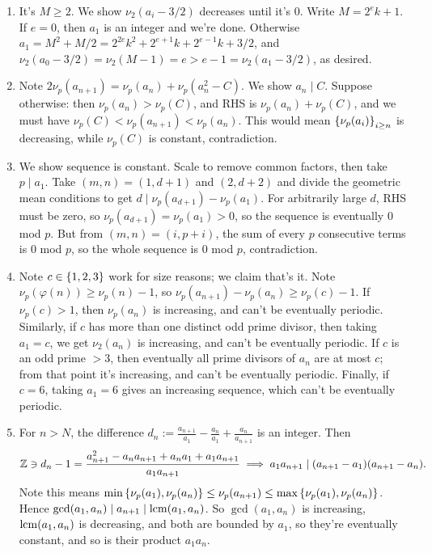 \documentclass[11pt,paper=letter]{scrartcl}
\begin{document}
\begin{enumerate}
\item It's $M \ge 2$. We show $\nu_2(a_i - 3/2)$ decreases until it's $0$. Write $M = 2^ek + 1$. If $e = 0$, then $a_1$ is an integer and we're done. Otherwise $a_1 = M^2 + M/2 = 2^{2e}k^2 + 2^{e + 1}k + 2^{e - 1}k + 3/2$, and $\nu_2(a_0 - 3/2) = \nu_2(M - 1) = e > e-1 = \nu_2(a_1 - 3/2)$, as desired.

\item Note $2\nu_p(a_{n+1}) = \nu_p(a_n) + \nu_p(a_n^2 - C)$. We show $a_n \mid C$. Suppose otherwise: then $\nu_p(a_n) > \nu_p(C)$, and RHS is $\nu_p(a_n) + \nu_p(C)$, and we must have $\nu_p(C) < \nu_p(a_{n+1}) < \nu_p(a_n)$. This would mean $\left\{ \nu_p(a_i) \right\}_{i \ge n}$ is decreasing, while $\nu_p(C)$ is constant, contradiction.

\item We show sequence is constant. Scale to remove common factors, then take $p \mid a_1$. Take $(m, n) = (1, d + 1)$ and $(2, d + 2)$ and divide the geometric mean conditions to get $ d \mid \nu_p( a_{d + 1} ) - \nu_p( a_1 ) $. For arbitrarily large $d$, RHS must be zero, so $\nu_p(a_{d+1}) = \nu_p(a_1) > 0$, so the sequence is eventually $0$ mod $p$. But from $(m, n) = (i, p + i)$, the sum of every $p$ consecutive terms is $0$ mod $p$, so the whole sequence is $0$ mod $p$, contradiction.

\item Note $c \in \left\{ 1, 2, 3 \right\}$ work for size reasons; we claim that's it. Note $\nu_p(\varphi(n)) \ge \nu_p(n) - 1$, so $\nu_p(a_{n+1}) - \nu_p(a_n) \ge \nu_p(c) - 1$. If $\nu_p(c) > 1$, then $\nu_p(a_n)$ is increasing, and can't be eventually periodic. Similarly, if $c$ has more than one distinct odd prime divisor, then taking $a_1 = c$, we get $\nu_2(a_n)$ is increasing, and can't be eventually periodic. If $c$ is an odd prime $> 3$, then eventually all prime divisors of $a_n$ are at most $c$; from that point it's increasing, and can't be eventually periodic. Finally, if $c = 6$, taking $a_1 = 6$ gives an increasing sequence, which can't be eventually periodic.

\item For $n > N$, the difference $d_n := \frac{a_{n+1}}{a_1} - \frac{a_n}{a_1} + \frac{a_n}{a_{n+1}}$ is an integer. Then \[
  \mathbb Z \ni d_n - 1 = \frac{a_{n+1}^2 - a_na_{n+1} + a_na_1 + a_1a_{n+1}}{a_1a_{n+1}} \implies a_1a_{n+1} \mid (a_{n+1} - a_1)(a_{n+1} - a_n).
\]
Note this means $\min\left\{  \nu_p(a_1 ), \nu_p(a_n )  \right\} \le \nu_p(a_{n+1} ) \le \max \left\{   \nu_p(a_1 ), \nu_p(a_n )   \right\} $. Hence $ \gcd(a_1, a_n) \mid a_{n+1} \mid \operatorname*{lcm}(a_1, a_n)$. So $\gcd(a_1, a_n)$ is increasing, $\operatorname*{lcm}(a_1, a_n)$ is decreasing, and both are bounded by $a_1$, so they're eventually constant, and so is their product $a_1a_n$.


\end{enumerate}
\end{document}

